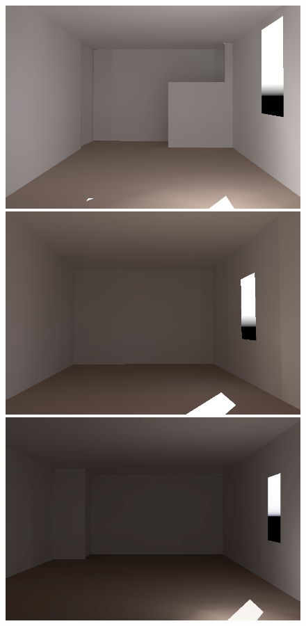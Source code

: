 \begin{figure}[t]
\begin{small}
\includegraphics[width=\figwidth]{p2r_098_camera_dark_march_crop.png} \hfill    %
\includegraphics[width=\figwidth]{p2r_user_085_camera_dark_march_crop.png} \hfill    %
\includegraphics[width=\figwidth]{p2r_PRE_N6_march_dark.png} \\


\end{small}
\end{figure}
